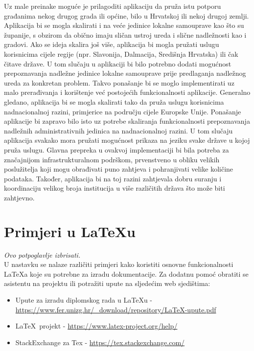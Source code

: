 		Uz male preinake moguće je prilagoditi aplikaciju da pruža istu potporu građanima nekog drugog grada ili općine, bilo u Hrvatskoj ili nekoj drugoj zemlji. Aplikacija bi se mogla skalirati i na veće jedinice lokalne samouprave kao što su županije, s obzirom da obično imaju sličan ustroj ureda i slične nadležnosti kao i gradovi. Ako se ideja skalira još više, aplikacija bi mogla pružati uslugu korisnicima cijele regije (npr. Slavonija, Dalmacija, Središnja Hrvatska) ili čak čitave države. U tom slučaju u aplikaciji bi bilo potrebno dodati mogućnost prepoznavanja nadležne jedinice lokalne samouprave prije predlaganja nadležnog ureda za konkretan problem. Takvo ponašanje bi se moglo implementirati uz malo prerađivanja i korištenje već postojećih funkcionalnosti aplikacije. Generalno gledano, aplikacija bi se mogla skalirati tako da pruža uslugu korisnicima nadnacionalnoj razini, primjerice na području cijele Europske Unije. Ponašanje aplikacije bi zapravo bilo isto uz potrebe skaliranja funkcionalnosti prepoznavanja nadležnih administrativnih jedinica na nadnacionalnoj razini. U tom slučaju aplikacija svakako mora pružati mogućnost prikaza na jeziku svake države u kojoj pruža uslugu. Glavna prepreka u ovakvoj implementaciji bi bila potreba za značajnijom infrastrukturalnom podrškom, prvenstveno u obliku velikih poslužitelja koji mogu obrađivati puno zahtjeva i pohranjivati velike količine podataka. Također, aplikacija bi na toj razini zahtjevala dobru suranju i koordinaciju velikog broja institucija u više različitih država što može biti zahtjevno.
		
		\eject
		
		\section{Primjeri u \LaTeX u}
		
		\textit{Ovo potpoglavlje izbrisati.}\\

		U nastavku se nalaze različiti primjeri kako koristiti osnovne funkcionalnosti \LaTeX a koje su potrebne za izradu dokumentacije. Za dodatnu pomoć obratiti se asistentu na projektu ili potražiti upute na sljedećim web sjedištima:
		\begin{itemize}
			\item Upute za izradu diplomskog rada u \LaTeX u - \url{https://www.fer.unizg.hr/_download/repository/LaTeX-upute.pdf}
			\item \LaTeX\ projekt - \url{https://www.latex-project.org/help/}
			\item StackExchange za Tex - \url{https://tex.stackexchange.com/}\\
		
		\end{itemize} 	


